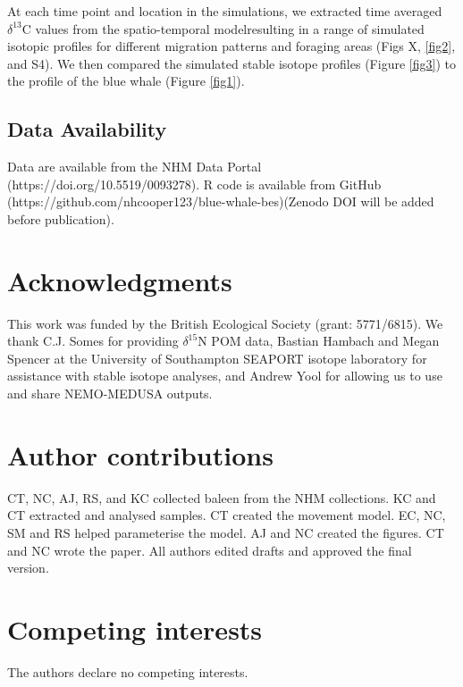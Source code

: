 \documentclass[a4paper,12pt]{article}
\begin{document}
At each time point and location in the simulations, we extracted time averaged \(\delta^{13}\)C values from the spatio-temporal model\cite{magozzi2017using}resulting in a range of simulated isotopic profiles for different migration patterns and foraging areas (Figs X, \ref{fig2}, and S4). %
We then compared the simulated stable isotope profiles (Figure \ref{fig3}) to the profile of the blue whale (Figure \ref{fig1}).

\subsection{Data Availability}
Data are available from the NHM Data Portal (https://doi.org/10.5519/0093278). 
R code is available from GitHub (https://github.com/nhcooper123/blue-whale-bes)(Zenodo DOI will be added before publication).


%



\section{Acknowledgments}\label{acknowledgments}
This work was funded by the British Ecological Society (grant: 5771/6815). 
We thank C.J. Somes for providing  $\delta^{15}$N POM data, Bastian Hambach and Megan Spencer at the University of Southampton SEAPORT isotope laboratory for assistance with stable isotope analyses, and Andrew Yool for allowing us to use and share NEMO-MEDUSA outputs.

\section{Author contributions}\label{author-contributions}
CT, NC, AJ, RS, and KC collected baleen from the NHM collections. 
KC and CT extracted and analysed samples.
CT created the movement model.
EC, NC, SM and RS helped parameterise the model.
AJ and NC created the figures. 
CT and NC wrote the paper.
All authors edited drafts and approved the final version.

\section{Competing interests}
The authors declare no competing interests.
\end{document}

